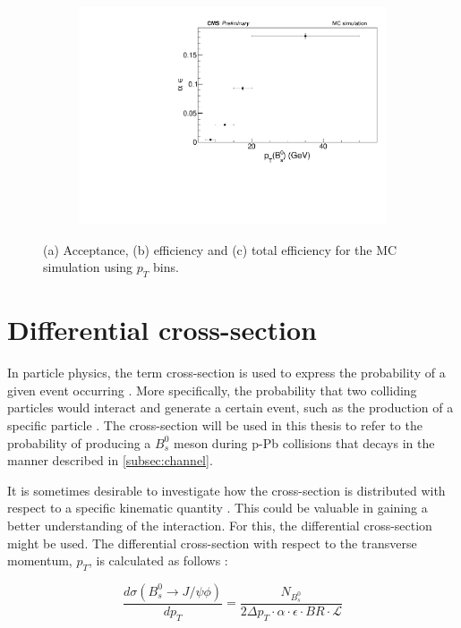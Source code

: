 \begin{figure}[htp!]
\begin{subfigure}[b]{0.8\textwidth}
		\centering
		\includegraphics[width=\textwidth]{MainContent/Figs/effy/totaleffy_ptbins.PDF}
		\caption{}%
	\end{subfigure}
	\caption{(a) Acceptance, (b) efficiency and (c) total efficiency for the MC simulation using $p_T$ bins.}
	\label{fig:effy_ptbins}
\end{figure}

\section{Differential cross-section}

In particle physics, the term cross-section is used to express the probability of a given event occurring \cite{thomson2013modern}. More specifically, the probability that two colliding particles would interact and generate a certain event, such as the production of a specific particle \cite{pivarski2013}. The cross-section will be used in this thesis to refer to the probability of producing a $B^0_s$ meson during p-Pb collisions that decays in the manner described in \ref{subsec:channel}.

It is sometimes desirable to investigate how the cross-section is distributed with respect to a specific kinematic quantity  \cite{thomson2013modern}. This could be valuable in gaining a better understanding of the interaction. For this, the differential cross-section might be used. The differential cross-section with respect to the transverse momentum, $p_T$, is calculated as follows \cite{abe1995measurement}: 

\begin{equation}
	\label{eq:cs}
\frac{d \sigma(B_s^0 \to J/\psi\phi)}{dp_T} = \frac{N_{B^0_s}}{2 \Delta p_T \cdot \alpha \cdot \epsilon \cdot BR \cdot \mathcal{L}}
\end{equation}

